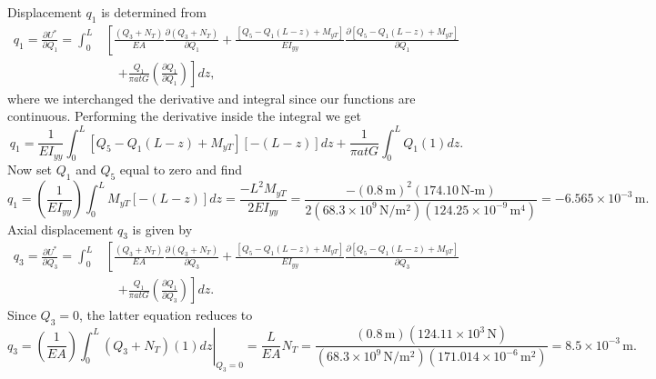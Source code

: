 \documentclass{AeroStructure-ERJohnson}
\begin{document}
\begin{example*}
\noindent Displacement $q_1$ is determined\vspace*{-3pt} from
\begin{align*}
q_{1}=\frac{\partial U^{*}}{\partial Q_{1}}=\int_{0}^{L} &\left[\frac{\left(Q_{3}+N_{T}\right)}{E A} \frac{\partial\left(Q_{3}+N_{T}\right)}{\partial Q_{1}}+\frac{\left[Q_{5}-Q_{1}(L-z)+M_{y T}\right]}{E I_{y y}} \frac{\partial\left[Q_{5}-Q_{1}(L-z)+M_{y T}\right]}{\partial Q_{1}} \right.\nonumber \\
&\quad \left. +\frac{Q_{1}}{\pi a t G}\left(\frac{\partial Q_{1}}{\partial Q_{1}}\right)\right] d z,\tag{k}
\end{align*}
where we interchanged the derivative and integral since our functions are continuous. Performing the derivative inside the integral we\vspace*{-3pt} get
\begin{equation*}
q_{1}=\frac{1}{E I_{y y}} \int_{0}^{L}\left[Q_{5}-Q_{1}(L-z)+M_{y T}\right][-(L-z)] d z+\frac{1}{\pi a t G} \int_{0}^{L} Q_{1}(1) d z.\tag{l}
\end{equation*}
Now set $Q_1$ and $Q_5$ equal to zero and\vspace*{-3pt} find
\begin{equation*}
q_{1}=\left(\frac{1}{E I_{y y}}\right) \int_{0}^{L} M_{y T}[-(L-z)] d z=\frac{-L^{2} M_{y T}}{2 E I_{y y}}=\frac{-(0.8\,\mathrm{m})^{2}(174.10\,\mathrm{N}\mbox{-}\mathrm{m})}{2\left(68.3 \times 10^{9}\,\mathrm{N} / \mathrm{m}^{2}\right)\left(124.25 \times 10^{-9}\,\mathrm{m}^{4}\right)}=-6.565 \times 10^{-3}\,\mathrm{m}.\tag{m}
\end{equation*}
Axial displacement $q_3$ is given\vspace*{-3pt} by
\begin{align*}
q_{3}=\frac{\partial U^{*}}{\partial Q_{3}}=\int_{0}^{L}&\left[\frac{\left(Q_{3}+N_{T}\right)}{E A} \frac{\partial\left(Q_{3}+N_{T}\right)}{\partial Q_{3}}+\frac{\left[Q_{5}-Q_{1}(L-z)+M_{y T}\right]}{E I_{y y}} \frac{\partial \left[Q_{5}-Q_{1}(L-z)+M_{y T}\right]}{\partial Q_{3}} \right.\nonumber\\
&\quad\left.+\frac{Q_{1}}{\pi a t G}\left(\frac{\partial Q_{1}}{\partial Q_{3}}\right)\right] d z.\tag{n}
\end{align*}
Since $Q_3 = 0$, the latter equation reduces\vspace*{-3pt} to
\begin{equation*}
q_{3}=\left.\left(\frac{1}{E A}\right) \int_{0}^{L}\left(Q_{3}+N_{T}\right)(1) d z\right|_{Q_{3}=0}=\frac{L}{E A} N_{T}=\frac{(0.8\,\mathrm{m})\left(124.11 \times 10^{3}\,\mathrm{N}\right)}{\left(68.3 \times 10^{9}\,\mathrm{N} / \mathrm{m}^{2}\right)\left(171.014 \times 10^{-6}\,\mathrm{m}^{2}\right)}=8.5 \times 10^{-3}\,\mathrm{m}.\tag{o}

\end{equation*}
\end{example*}
\end{document}

